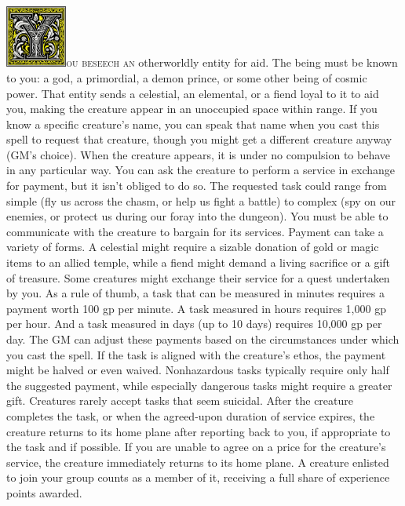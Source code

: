 \documentclass[12pt,showtrims]{memoir}
\begin{document}
\vspace{1\baselineskip}\noindent
\lettrine[lines=4]{\includegraphics[height=58pt]{initials/Y.png}}{ou beseech an} otherworldly entity for aid. The being must be known to you: a god, a primordial, a demon prince, or some other being of cosmic power. That entity sends a celestial, an elemental, or a fiend loyal to it to aid you, making the creature appear in an unoccupied space within range. If you know a specific creature's name, you can speak that name when you cast this spell to request that creature, though you might get a different creature anyway (GM's choice). When the creature appears, it is under no compulsion to behave in any particular way. You can ask the creature to perform a service in exchange for payment, but it isn't obliged to do so. The requested task could range from simple (fly us across the chasm, or help us fight a battle) to complex (spy on our enemies, or protect us during our foray into the dungeon). You must be able to communicate with the creature to bargain for its services. Payment can take a variety of forms. A celestial might require a sizable donation of gold or magic items to an allied temple, while a fiend might demand a living sacrifice or a gift of treasure. Some creatures might exchange their service for a quest undertaken by you. As a rule of thumb, a task that can be measured in minutes requires a payment worth 100 gp per minute. A task measured in hours requires 1,000 gp per hour. And a task measured in days (up to 10 days) requires 10,000 gp per day. The GM can adjust these payments based on the circumstances under which you cast the spell. If the task is aligned with the creature's ethos, the payment might be halved or even waived. Nonhazardous tasks typically require only half the suggested payment, while especially dangerous tasks might require a greater gift. Creatures rarely accept tasks that seem suicidal. After the creature completes the task, or when the agreed-upon duration of service expires, the creature returns to its home plane after reporting back to you, if appropriate to the task and if possible. If you are unable to agree on a price for the creature's service, the creature immediately returns to its home plane. A creature enlisted to join your group counts as a member of it, receiving a full share of experience points awarded.
\end{document}
